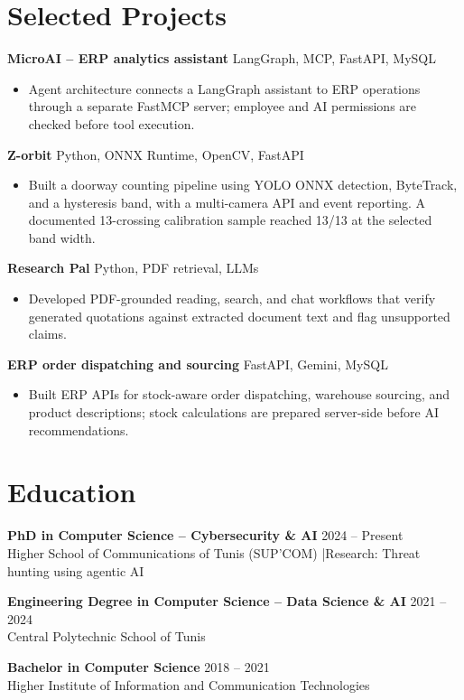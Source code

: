 \documentclass[10pt,a4paper]{article}
\begin{document}
\section{Selected Projects}
\textbf{MicroAI -- ERP analytics assistant} \hfill {\small LangGraph, MCP, FastAPI, MySQL}
\begin{itemize}
  \item Agent architecture connects a LangGraph assistant to ERP operations through a separate FastMCP server; employee and AI permissions are checked before tool execution.
\end{itemize}
\textbf{Z-orbit} \hfill {\small Python, ONNX Runtime, OpenCV, FastAPI}
\begin{itemize}
  \item Built a doorway counting pipeline using YOLO ONNX detection, ByteTrack, and a hysteresis band, with a multi-camera API and event reporting. A documented 13-crossing calibration sample reached 13/13 at the selected band width.
\end{itemize}
\textbf{Research Pal} \hfill {\small Python, PDF retrieval, LLMs}
\begin{itemize}
  \item Developed PDF-grounded reading, search, and chat workflows that verify generated quotations against extracted document text and flag unsupported claims.
\end{itemize}
\textbf{ERP order dispatching and sourcing} \hfill {\small FastAPI, Gemini, MySQL}
\begin{itemize}
  \item Built ERP APIs for stock-aware order dispatching, warehouse sourcing, and product descriptions; stock calculations are prepared server-side before AI recommendations.
\end{itemize}

\section{Education}
\textbf{PhD in Computer Science -- Cybersecurity \& AI} \hfill 2024 -- Present\\
Higher School of Communications of Tunis (SUP'COM) \quad|\quad Research: Threat hunting using agentic AI

\textbf{Engineering Degree in Computer Science -- Data Science \& AI} \hfill 2021 -- 2024\\
Central Polytechnic School of Tunis

\textbf{Bachelor in Computer Science} \hfill 2018 -- 2021\\
Higher Institute of Information and Communication Technologies
\end{document}
